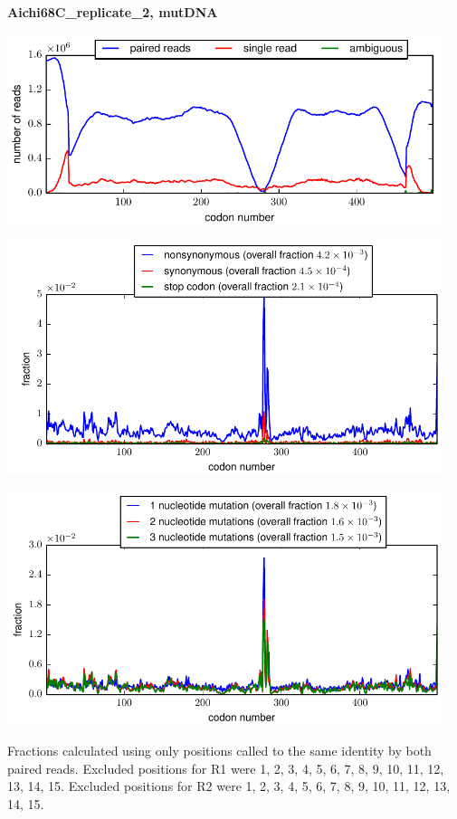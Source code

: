 \documentclass[10pt,letterpaper]{article}
\begin{document}
\centerline{\Large \bf Aichi68C\_replicate\_2, mutDNA}
\vspace{0.1in}

\centerline{\includegraphics[width=5in]{Aichi68C_replicate_2_mutDNA_codondepth.pdf}}
\vspace{0.1in}

\centerline{\includegraphics[width=5in]{Aichi68C_replicate_2_mutDNA_syn-ns-dist.pdf}}
\vspace{0.1in}

\centerline{\includegraphics[width=5in]{Aichi68C_replicate_2_mutDNA_nmutspercodon-dist.pdf}}
\vspace{0.1in}

Fractions calculated using only positions called to the same identity by both paired reads.  Excluded positions for R1 were 1, 2, 3, 4, 5, 6, 7, 8, 9, 10, 11, 12, 13, 14, 15. 
 Excluded positions for R2 were 1, 2, 3, 4, 5, 6, 7, 8, 9, 10, 11, 12, 13, 14, 15. 
\end{document}
